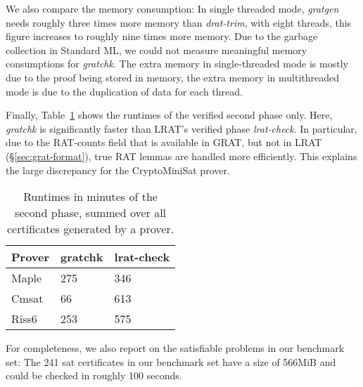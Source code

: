 \documentclass[smallcondensed]{svjour3}     %
\begin{document}
  We also compare the memory consumption: In single threaded mode, {\sl gratgen} needs roughly three times more memory than {\sl drat-trim}, with eight threads, this figure increases to 
  roughly nine times more memory. Due to the garbage collection in Standard ML, we could not measure meaningful memory consumptions for {\sl gratchk}.
  The extra memory in single-threaded mode is mostly due to the proof being stored in memory, the extra memory in multithreaded mode is due to the duplication of data for each thread.
  
  Finally, Table~\ref{tab:check_phases} shows the runtimes of the verified second phase only. 
  Here, {\sl gratchk} is significantly faster than LRAT's verified phase {\sl lrat-check}. 
  In particular, due to the RAT-counts field that is available in GRAT, but not in LRAT (\cf\S\ref{sec:grat-format}), true RAT lemmas are handled more efficiently. This explains the large discrepancy for the CryptoMiniSat prover.
  \begin{table}
    \begin{minipage}{.42\textwidth}
    \begin{tabular}{|l|l|l|}
      \bf Prover & \bf gratchk & \bf lrat-check \\\hline
      Maple      & 275         & 346 \\
      Cmsat      & 66          & 613 \\
      Riss6      & 253         & 575 \\\hline
    \end{tabular}
    \end{minipage}
    \hspace*{.05\textwidth}
    \begin{minipage}{.5\textwidth}
    \caption{Runtimes in minutes of the second phase, summed over all certificates generated by a prover.}\label{tab:check_phases}
    \end{minipage}
  \end{table}
  
  
  For completeness, we also report on the satisfiable problems in our benchmark set: The 241 sat certificates in our benchmark set have a size of 566MiB and could be
  checked in roughly 100 seconds.

  
  
  
\end{document}
